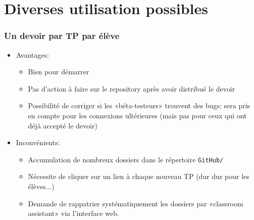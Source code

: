 \section{Diverses utilisation possibles}


\begin{frame}
	\frametitle{Un devoir par TP par élève}

	\begin{itemize}[<+->]
		\item Avantages:
			\begin{itemize}[<+->]
					\item Bien pour démarrer

					\item Pas d'action à faire sur le repository après avoir distribué le devoir

					\item Possibilité de corriger si les «béta-testeurs» trouvent des bugs: sera pris en compte pour les connexions ultérieures (mais pas pour ceux qui ont déjà accepté le devoir)
			\end{itemize}
		\item Inconvénients:
			\begin{itemize}[<+->]
					\item Accumulation de nombreux dossiers dans le répertoire \texttt{GitHub/}

					\item Nécessite de cliquer sur un lien à chaque nouveau TP (dur dur pour les élèves...)

					\item Demande de rappatrier systématiquement les dossiers par «classroom assistant» via l'interface web.
			\end{itemize}
	\end{itemize}

\end{frame}


